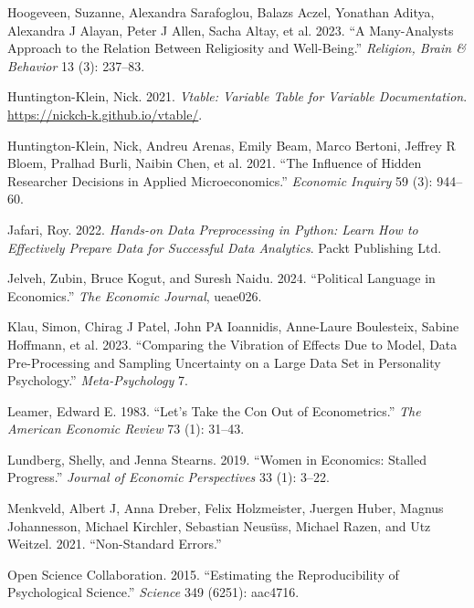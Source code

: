 \documentclass[
  letterpaper,
  DIV=11,
  numbers=noendperiod]{scrartcl}
\newlength{\cslhangindent}
\newlength{\cslentryspacingunit} %
\newenvironment{CSLReferences}[2] %
 {%
  \setlength{\parindent}{0pt}
  \ifodd #1
  \let\oldpar\par
  \def\par{\hangindent=\cslhangindent\oldpar}
  \fi
  \setlength{\parskip}{#2\cslentryspacingunit}
 }%
 {}
\begin{document}
\begin{CSLReferences}{1}{0}
\leavevmode{}%
Hoogeveen, Suzanne, Alexandra Sarafoglou, Balazs Aczel, Yonathan Aditya,
Alexandra J Alayan, Peter J Allen, Sacha Altay, et al. 2023. {``A
Many-Analysts Approach to the Relation Between Religiosity and
Well-Being.''} \emph{Religion, Brain \& Behavior} 13 (3): 237--83.

\leavevmode{}%
Huntington-Klein, Nick. 2021. \emph{Vtable: Variable Table for Variable
Documentation}. \url{https://nickch-k.github.io/vtable/}.

\leavevmode{}%
Huntington-Klein, Nick, Andreu Arenas, Emily Beam, Marco Bertoni,
Jeffrey R Bloem, Pralhad Burli, Naibin Chen, et al. 2021. {``The
Influence of Hidden Researcher Decisions in Applied Microeconomics.''}
\emph{Economic Inquiry} 59 (3): 944--60.

\leavevmode{}%
Jafari, Roy. 2022. \emph{Hands-on Data Preprocessing in Python: Learn
How to Effectively Prepare Data for Successful Data Analytics}. Packt
Publishing Ltd.

\leavevmode{}%
Jelveh, Zubin, Bruce Kogut, and Suresh Naidu. 2024. {``Political
Language in Economics.''} \emph{The Economic Journal}, ueae026.

\leavevmode{}%
Klau, Simon, Chirag J Patel, John PA Ioannidis, Anne-Laure Boulesteix,
Sabine Hoffmann, et al. 2023. {``Comparing the Vibration of Effects Due
to Model, Data Pre-Processing and Sampling Uncertainty on a Large Data
Set in Personality Psychology.''} \emph{Meta-Psychology} 7.

\leavevmode{}%
Leamer, Edward E. 1983. {``Let's Take the Con Out of Econometrics.''}
\emph{The American Economic Review} 73 (1): 31--43.

\leavevmode{}%
Lundberg, Shelly, and Jenna Stearns. 2019. {``Women in Economics:
Stalled Progress.''} \emph{Journal of Economic Perspectives} 33 (1):
3--22.

\leavevmode{}%
Menkveld, Albert J, Anna Dreber, Felix Holzmeister, Juergen Huber,
Magnus Johannesson, Michael Kirchler, Sebastian Neusüss, Michael Razen,
and Utz Weitzel. 2021. {``Non-Standard Errors.''}

\leavevmode{}%
Open Science Collaboration. 2015. {``Estimating the Reproducibility of
Psychological Science.''} \emph{Science} 349 (6251): aac4716.


\end{CSLReferences}
\end{document}
